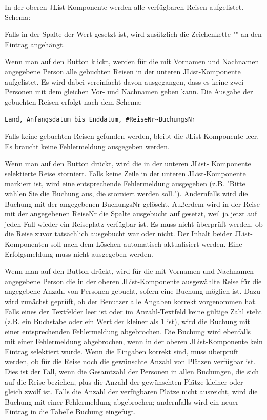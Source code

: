 \begin{compactenum}[a)]
In der oberen JList-Komponente werden alle verfügbaren Reisen aufgelistet. Schema:


Falls in der Spalte  der Wert  gesetzt
ist, wird zusätzlich die Zeichenkette "" an den
Eintrag angehängt.

Wenn man auf den Button  klickt, werden für die mit
Vornamen und Nachnamen angegebene Person alle gebuchten Reisen in der unteren
JList-Komponente aufgelistet. Es wird dabei vereinfacht davon ausgegangen, dass
es keine zwei Personen mit dem gleichen Vor- und Nachnamen geben kann. Die
Ausgabe der gebuchten Reisen erfolgt nach dem Schema:

\verb|Land, Anfangsdatum bis Enddatum, #ReiseNr~BuchungsNr|

Falls keine gebuchten Reisen gefunden werden, bleibt die JList-Komponente leer.
Es braucht keine Fehlermeldung ausgegeben werden.

Wenn man auf den Button  drückt, wird die in
der unteren JList- Komponente selektierte Reise storniert. Falls keine Zeile in
der unteren JList-Komponente markiert ist, wird eine entsprechende
Fehlermeldung ausgegeben (z.B. "Bitte wählen Sie die Buchung aus, die storniert
werden soll."). Andernfalls wird die Buchung mit der angegebenen BuchungsNr gelöscht.
Außerdem wird in der Reise mit der angegebenen ReiseNr die Spalte ausgebucht
auf  gesetzt, weil ja jetzt auf jeden Fall wieder ein
Reiseplatz verfügbar ist. Es muss nicht überprüft werden, ob die Reise zuvor
tatsächlich ausgebucht war oder nicht. Der Inhalt beider JList-Komponenten soll
nach dem Löschen automatisch aktualisiert werden. Eine Erfolgsmeldung muss
nicht ausgegeben werden.

Wenn man auf den Button  drückt, wird für die mit
Vornamen und Nachnamen angegebene Person die in der oberen JList-Komponente
ausgewählte Reise für die angegebene Anzahl von Personen gebucht, sofern eine
Buchung möglich ist. Dazu wird zunächst geprüft, ob der Benutzer alle Angaben
korrekt vorgenommen hat. Falls eines der Textfelder leer ist oder im
Anzahl-Textfeld keine gültige Zahl steht (z.B. ein Buchstabe oder ein Wert der
kleiner als 1 ist), wird die Buchung mit einer entsprechenden Fehlermeldung
abgebrochen. Die Buchung wird ebenfalls mit einer Fehlermeldung abgebrochen,
wenn in der oberen JList-Komponente kein Eintrag selektiert wurde. Wenn die
Eingaben korrekt sind, muss überprüft werden, ob für die Reise noch die
gewünschte Anzahl von Plätzen verfügbar ist. Dies ist der Fall, wenn die
Gesamtzahl der Personen in allen Buchungen, die sich auf die Reise beziehen,
plus die Anzahl der gewünschten Plätze kleiner oder gleich zwölf ist. Falls die
Anzahl der verfügbaren Plätze nicht ausreicht, wird die Buchung mit einer
Fehlermeldung abgebrochen; andernfalls wird ein neuer Eintrag in die Tabelle
Buchung eingefügt.


\end{compactenum}
